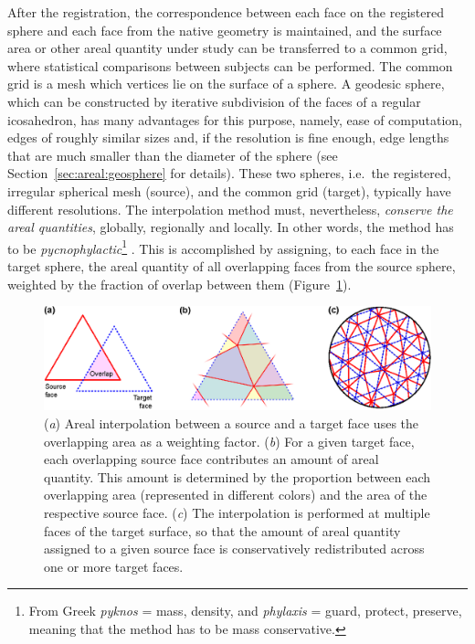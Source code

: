 After the registration, the correspondence between each face on the registered sphere and each face from the native geometry is maintained, and the surface area or other areal quantity under study can be transferred to a common grid, where statistical comparisons between subjects can be performed. The common grid is a mesh which vertices lie on the surface of a sphere. A geodesic sphere, which can be constructed by iterative subdivision of the faces of a regular icosahedron, has many advantages for this purpose, namely, ease of computation, edges of roughly similar sizes and, if the resolution is fine enough, edge lengths that are much smaller than the diameter of the sphere (see Section~\ref{sec:areal:geosphere} for details). These two spheres, i.e.\ the registered, irregular spherical mesh (source), and the common grid (target), typically have different resolutions. The interpolation method must, nevertheless, \emph{conserve the areal quantities}, globally, regionally and locally. In other words, the method has to be \emph{pycnophylactic}\footnote{From Greek \emph{pyknos} = mass, density, and \emph{phylaxis} = guard, protect, preserve, meaning that the method has to be mass conservative.} \citep{Tobler1979}. This is accomplished by assigning, to each face in the target sphere, the areal quantity of all overlapping faces from the source sphere, weighted by the fraction of overlap between them (Figure~\ref{fig:areal:triangles}).

\begin{figure}[!t]  %
\centering
\includegraphics[width=14cm]{images/triangles.eps}
\caption[Overlapping areas used to weight areal quantities during interpolation.]{(\emph{a}) Areal interpolation between a source and a target face uses the overlapping area as a weighting factor. (\emph{b}) For a given target face, each overlapping source face contributes an amount of areal quantity. This amount is determined by the proportion between each overlapping area (represented in different colors) and the area of the respective source face. (\emph{c}) The interpolation is performed at multiple faces of the target surface, so that the amount of areal quantity assigned to a given source face is conservatively redistributed across one or more target faces.}
\label{fig:areal:triangles}
\end{figure}

